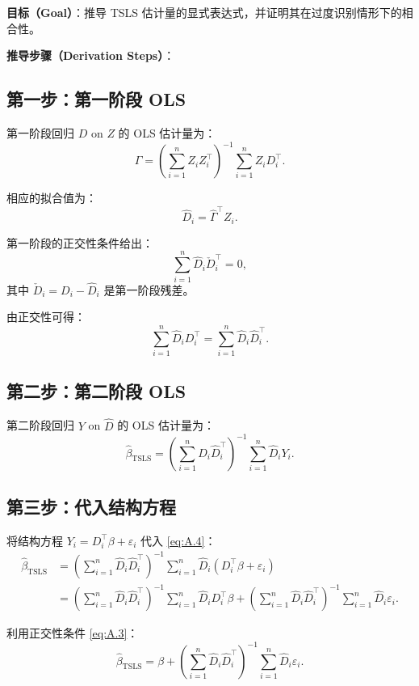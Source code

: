 \textbf{目标（Goal）}：推导 TSLS 估计量的显式表达式，并证明其在过度识别情形下的相合性。

\textbf{推导步骤（Derivation Steps）}：

\subsection*{第一步：第一阶段 OLS}

第一阶段回归 $D$ on $Z$ 的 OLS 估计量为：
\[
\hat{\Gamma} = \left(\sum_{i=1}^{n}Z_iZ_i^{\top}\right)^{-1}\sum_{i=1}^{n}Z_iD_i^{\top}.
\]

相应的拟合值为：
\[
\hat{D}_i = \hat{\Gamma}^{\top}Z_i. \label{eq:A.1}
\]

第一阶段的正交性条件给出：
\[
\sum_{i=1}^{n}\hat{D}_i\check{D}_i^{\top} = 0, \label{eq:A.2}
\]
其中 $\check{D}_i = D_i - \hat{D}_i$ 是第一阶段残差。

由正交性可得：
\[
\sum_{i=1}^{n}\hat{D}_iD_i^{\top} = \sum_{i=1}^{n}\hat{D}_i\hat{D}_i^{\top}. \label{eq:A.3}
\]

\subsection*{第二步：第二阶段 OLS}

第二阶段回归 $Y$ on $\hat{D}$ 的 OLS 估计量为：
\[
\hat{\beta}_{\mathrm{TSLS}} = \left(\sum_{i=1}^{n}\hat{D}_i\hat{D}_i^{\top}\right)^{-1}\sum_{i=1}^{n}\hat{D}_iY_i. \label{eq:A.4}
\]

\subsection*{第三步：代入结构方程}

将结构方程 $Y_i = D_i^{\top}\beta + \varepsilon_i$ 代入 \cref{eq:A.4}：
\[
\begin{aligned}
\hat{\beta}_{\mathrm{TSLS}} &= \left(\sum_{i=1}^{n}\hat{D}_i\hat{D}_i^{\top}\right)^{-1}\sum_{i=1}^{n}\hat{D}_i(D_i^{\top}\beta + \varepsilon_i) \\
&= \left(\sum_{i=1}^{n}\hat{D}_i\hat{D}_i^{\top}\right)^{-1}\sum_{i=1}^{n}\hat{D}_iD_i^{\top}\beta + \left(\sum_{i=1}^{n}\hat{D}_i\hat{D}_i^{\top}\right)^{-1}\sum_{i=1}^{n}\hat{D}_i\varepsilon_i.
\end{aligned}
\]

利用正交性条件 \cref{eq:A.3}：
\[
\hat{\beta}_{\mathrm{TSLS}} = \beta + \left(\sum_{i=1}^{n}\hat{D}_i\hat{D}_i^{\top}\right)^{-1}\sum_{i=1}^{n}\hat{D}_i\varepsilon_i. \label{eq:A.5}
\]

